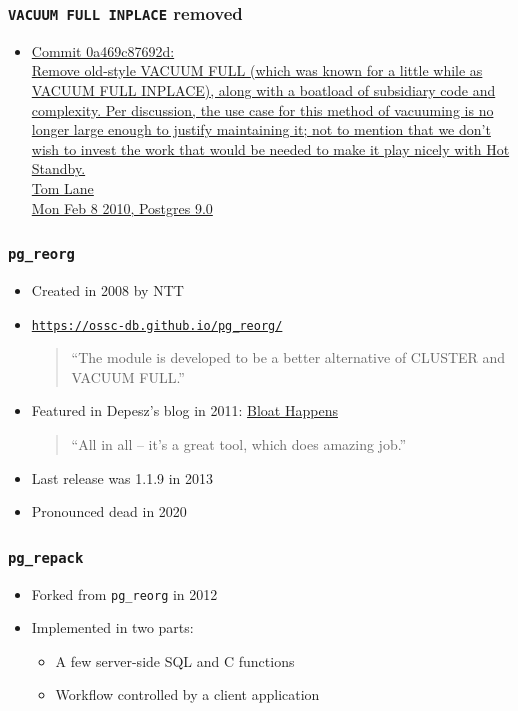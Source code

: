 \begin{frame}
  \frametitle{\texttt{VACUUM FULL INPLACE} removed}
  \begin{itemize}
    \item {\linksize \href{https://git.postgresql.org/cgit/postgresql.git/commit/?id=0a469c87692d15a22eaa69d4b3a43dd8e278dd64}
      {Commit 0a469c87692d: \faExternalLink \\
      Remove old-style VACUUM FULL (which was known for a little while as
      VACUUM FULL INPLACE), along with a boatload of subsidiary code and complexity.
      Per discussion, the use case for this method of vacuuming is no longer large
      enough to justify maintaining it; not to mention that we don't wish to invest
      the work that would be needed to make it play nicely with Hot Standby. \\
      Tom Lane \\
      Mon Feb 8 2010, Postgres 9.0}}
  \end{itemize}
\end{frame}

\begin{frame}
  \frametitle{\texttt{pg\_reorg}}
  \begin{itemize}
    \item Created in 2008 by NTT
    \item \href{https://ossc-db.github.io/pg_reorg/pg_reorg.html}{\texttt{https://ossc-db.github.io/pg\_reorg/}}
      \begin{quote}
	``The module is developed to be a better alternative of CLUSTER and VACUUM FULL.''
      \end{quote}
    \item Featured in Depesz's blog in 2011: \href{https://www.depesz.com/2011/07/06/bloat-happens/}{Bloat Happens}
      \begin{quote}
	``All in all – it's a great tool, which does amazing job.''
      \end{quote}
    \item Last release was 1.1.9 in 2013
    \item Pronounced dead in 2020
  \end{itemize}
\end{frame}

\begin{frame}
  \frametitle{\texttt{pg\_repack}}
  \begin{itemize}
    \item Forked from \texttt{pg\_reorg} in 2012
    \item Implemented in two parts:
      \begin{itemize}
	\item A few server-side SQL and C functions
	\item Workflow controlled by a client application
      \end{itemize}
  \end{itemize}
\end{frame}

